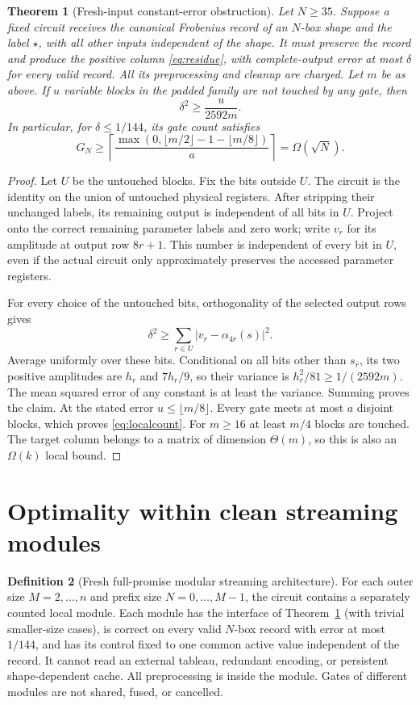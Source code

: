 \documentclass[11pt]{article}
\newtheorem{theorem}{Theorem}
\theoremstyle{definition}
\newtheorem{definition}[theorem]{Definition}
\begin{document}
\begin{theorem}[Fresh-input constant-error obstruction]\label{thm:local}
Let $N\ge35$. Suppose a fixed circuit receives the canonical Frobenius record of an
$N$-box shape and the label $\star$, with all other inputs independent of
the shape. It must preserve the record and produce the positive column
\eqref{eq:residue}, with complete-output error at most $\delta$ for every
valid record. All its preprocessing and cleanup are charged. Let $m$ be
as above. If $u$ variable blocks in the padded family are not touched by
any gate, then
\[
 \delta^2\ge\frac{u}{2592m}.
\]
In particular, for $\delta\le1/144$, its gate count satisfies
\begin{equation}\label{eq:localcount}
 G_N\ge\left\lceil\frac{
 \max(0,\lfloor m/2\rfloor-1-\lfloor m/8\rfloor)}a\right\rceil
 =\Omega(\sqrt N).
\end{equation}
\end{theorem}
\begin{proof}
Let $U$ be the untouched blocks. Fix the bits outside $U$. The circuit
is the identity on the union of untouched physical registers. After
stripping their unchanged labels, its remaining output is independent of
all bits in $U$. Project onto the correct remaining parameter labels and
zero work; write $v_r$ for its amplitude at output row $8r+1$. This number
is independent of every bit in $U$, even if the actual circuit only
approximately preserves the accessed parameter registers.

For every choice of the untouched bits, orthogonality of the selected
output rows gives
\[
 \delta^2\ge\sum_{r\in U}|v_r-\alpha_{4r}(s)|^2.
\]
Average uniformly over these bits. Conditional on all bits other than
$s_r$, its two positive amplitudes are $h_r$ and $7h_r/9$, so their
variance is $h_r^2/81\ge1/(2592m)$. The mean squared error of any
constant is at least the variance. Summing proves the claim.
At the stated error $u\le\lfloor m/8\rfloor$. Every gate meets at most
$a$ disjoint blocks, which proves \eqref{eq:localcount}. For $m\ge16$
at least $m/4$ blocks are touched. The target column belongs to a matrix
of dimension $\Theta(m)$, so this is also an $\Omega(k)$ local bound.
\end{proof}

\section{Optimality within clean streaming modules}

\begin{definition}[Fresh full-promise modular streaming architecture]
For each outer size $M=2,\ldots,n$ and prefix size $N=0,\ldots,M-1$,
the circuit contains a separately counted local module. Each module has
the interface of Theorem~\ref{thm:local} (with trivial smaller-size cases),
is correct on every valid $N$-box record with error at most $1/144$, and
has its control fixed to one common active value independent of the record.
It cannot read an external tableau, redundant encoding,
or persistent shape-dependent cache. All preprocessing is inside the
module. Gates of different modules are not shared, fused, or cancelled.
\end{definition}
\end{document}
